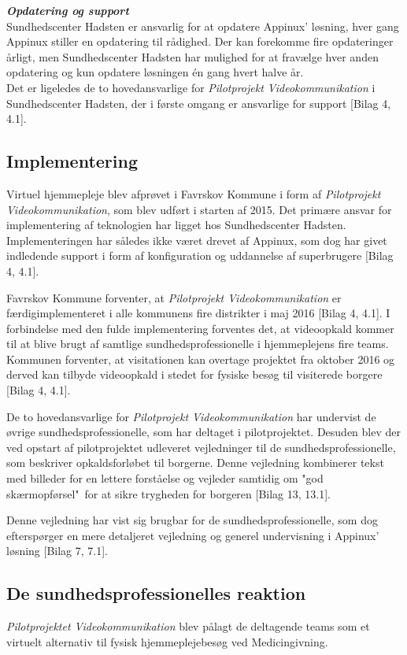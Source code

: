 \textit{\textbf{Opdatering og support}}\\
Sundhedscenter Hadsten er ansvarlig for at opdatere Appinux' løsning, hver gang Appinux stiller en opdatering til rådighed. Der kan forekomme fire opdateringer årligt, men Sundhedscenter Hadsten har mulighed for at fravælge hver anden opdatering og kun opdatere løsningen én gang hvert halve år.\\
Det er ligeledes de to hovedansvarlige for \textit{Pilotprojekt Videokommunikation} i Sundhedscenter Hadsten, der i første omgang er ansvarlige for support [Bilag 4, 4.1]. 

\subsection{Implementering}
Virtuel hjemmepleje blev afprøvet i Favrskov Kommune i form af \textit{Pilotprojekt Videokommunikation}, som blev udført i starten af 2015. Det primære ansvar for implementering af teknologien har ligget hos Sundhedscenter Hadsten. Implementeringen har således ikke været drevet af Appinux, som dog har givet indledende support i form af konfiguration og uddannelse af superbrugere [Bilag 4, 4.1].

Favrskov Kommune forventer, at \textit{Pilotprojekt Videokommunikation} er færdigimplementeret i alle kommunens fire distrikter i maj 2016 [Bilag 4, 4.1]. I forbindelse med den fulde implementering forventes det, at videoopkald kommer til at blive brugt af samtlige sundhedsprofessionelle i hjemmeplejens fire teams. Kommunen forventer, at visitationen kan overtage projektet fra oktober 2016 og derved kan tilbyde videoopkald i stedet for fysiske besøg til visiterede borgere [Bilag 4, 4.1].

De to hovedansvarlige for \textit{Pilotprojekt Videokommunikation} har undervist de øvrige sundhedsprofessionelle, som har deltaget i pilotprojektet. Desuden blev der ved opstart af pilotprojektet udleveret vejledninger til de sundhedsprofessionelle, som beskriver opkaldsforløbet til borgerne. Denne vejledning kombinerer tekst med billeder for en lettere forståelse og vejleder samtidig om "god skærmopførsel"\ for at sikre trygheden for borgeren [Bilag 13, 13.1].  

Denne vejledning har vist sig brugbar for de sundhedsprofessionelle, som dog efterspørger en mere detaljeret vejledning og generel undervisning i Appinux' løsning [Bilag 7, 7.1].

 
\subsection{De sundhedsprofessionelles reaktion}
\textit{Pilotprojektet Videokommunikation} blev pålagt de deltagende teams som et virtuelt alternativ til fysisk hjemmeplejebesøg ved Medicingivning. 

